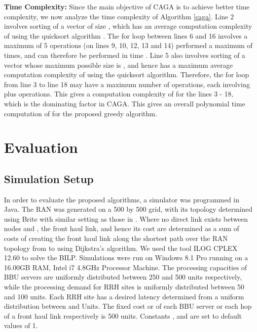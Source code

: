 \documentclass[conference]{IEEEtran}
\begin{document}
\noindent \textbf{Time Complexity:} Since the main objective of CAGA is to achieve better time complexity, we now analyze the time complexity of Algorithm \ref{caga}. Line 2 involves sorting of a vector of size , which has an average computation complexity of  using the quicksort algorithm \cite{Alsuwaiyel98}. The for loop between lines 6 and 16 involves a maximum of 5 operations (on lines 9, 10, 12, 13 and 14) performed a maximum of  times, and can therefore be performed in time . Line 5 also involves sorting of a vector whose maximum possible size is , and hence has a maximum average computation complexity of  using the quicksort algorithm. Therefore, the for loop from line 3 to line 18 may have a maximum number of  operations, each involving   plus  operations. This gives a computation complexity of  for the lines 3 - 18, which is the dominating factor in CAGA. This gives an overall polynomial time computation of  for the proposed greedy algorithm.

\section{Evaluation} \label{eval}
\subsection{Simulation Setup}
In order to evaluate the proposed algorithms, a simulator was programmed in Java. The RAN was generated on a 500 by 500 grid, with its topology determined using Brite with similar setting as those in \cite{rashidpagevine}. Where no direct link exists between nodes  and , the front haul link, and hence its cost  are determined as a sum of costs of creating the front haul link along the shortest path over the RAN topology from  to  using Dijkstra's algorithm. We used the tool ILOG CPLEX 12.60 \cite{CPLEX12.6} to solve the BILP. Simulations were run on Windows 8.1 Pro running on a 16.00GB RAM, Intel i7 4.8GHz Processor Machine. The processing capacities of BBU servers are uniformly distributed between 250 and 500 units respectively, while the processing demand for RRH sites is uniformly distributed between 50 and 100 units. Each RRH site has a desired latency determined from a uniform distribution between  and  Units. The fixed cost  or  of each BBU server or each hop of a front haul link respectively is 500 units. Constants ,  and  are set to default values of 1.
\end{document}
